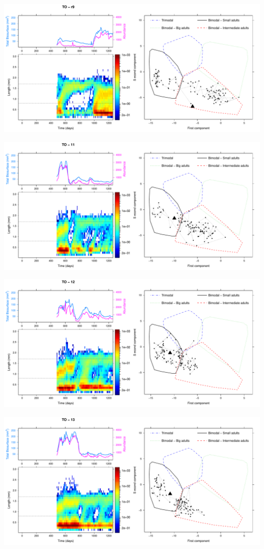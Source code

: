 \includegraphics[height=0.33\textheight]{3-1_ChapExp1/Fig/TO-21-r9}

\includegraphics[height=0.33\textheight]{3-1_ChapExp1/Fig/TO-21-11}

\includegraphics[height=0.33\textheight]{3-1_ChapExp1/Fig/TO-21-12}

\includegraphics[height=0.33\textheight]{3-1_ChapExp1/Fig/TO-21-13}

